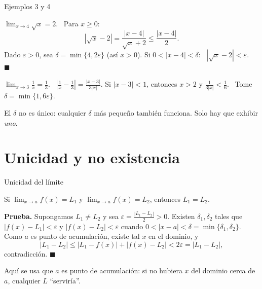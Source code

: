 \documentclass[10pt,aspectratio=169]{beamer}
\begin{document}
\begin{frame}{Ejemplos 3 y 4}
  \begin{ejemplo}
    $\displaystyle\lim_{x\to4}\sqrt x=2$. \ Para $x\ge0$:
    \[ |\sqrt x-2|=\frac{|x-4|}{\sqrt x+2}\le\frac{|x-4|}{2}. \]
    Dado $\varepsilon>0$, sea $\delta=\min\{4,2\varepsilon\}$ (así $x>0$). Si $0<|x-4|<\delta$: \ $|\sqrt x-2|<\varepsilon$. \ $\blacksquare$
  \end{ejemplo}
  \begin{ejemplo}[4: racional]
    $\displaystyle\lim_{x\to3}\frac1x=\frac13$. \ $\left|\frac1x-\frac13\right|=\frac{|x-3|}{3|x|}$.
    Si $|x-3|<1$, entonces $x>2$ y $\frac1{3|x|}<\frac16$. \ Tome $\delta=\min\{1,6\varepsilon\}$.
  \end{ejemplo}
  \begin{observacion}
    El $\delta$ no es único: cualquier $\delta$ más pequeño también funciona. Solo hay que exhibir \emph{uno}.
  \end{observacion}
\end{frame}

\section{Unicidad y no existencia}

\begin{frame}{Unicidad del límite}
  \begin{teorema}
    Si $\lim_{x\to a}f(x)=L_1$ y $\lim_{x\to a}f(x)=L_2$, entonces $L_1=L_2$.
  \end{teorema}
  \textbf{Prueba.} Supongamos $L_1\neq L_2$ y sea $\varepsilon=\frac{|L_1-L_2|}{2}>0$. Existen $\delta_1,\delta_2$ tales que
  $|f(x)-L_1|<\varepsilon$ y $|f(x)-L_2|<\varepsilon$ cuando $0<|x-a|<\delta=\min\{\delta_1,\delta_2\}$. Como $a$ es punto de acumulación,
  existe tal $x$ en el dominio, y
  \[ |L_1-L_2|\le|L_1-f(x)|+|f(x)-L_2|<2\varepsilon=|L_1-L_2|, \]
  contradicción. $\blacksquare$
  \begin{observacion}
    Aquí se usa que $a$ es punto de acumulación: si no hubiera $x$ del dominio cerca de $a$, cualquier $L$ ``serviría''.
  \end{observacion}
\end{frame}
\end{document}
